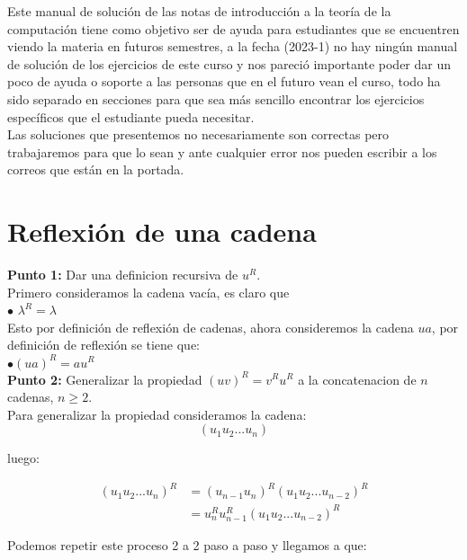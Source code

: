 Este manual de solución de las notas de introducción a la teoría de la computación tiene como objetivo ser de ayuda para estudiantes que se encuentren viendo la materia en futuros semestres, a la fecha (2023-1) no hay ningún manual de solución de los ejercicios de este curso y nos pareció importante poder dar un poco de ayuda o soporte a las personas que en el futuro vean el curso, todo ha sido separado en secciones para que sea más sencillo encontrar los ejercicios específicos que el estudiante pueda necesitar.\\

Las soluciones que presentemos no necesariamente son correctas pero trabajaremos para que lo sean y ante cualquier error nos pueden escribir a los correos que están en la portada.\\

\section{Reflexión de una cadena}

\textbf{Punto 1: }Dar una definicion recursiva de $u^R.$\\

 Primero consideramos la cadena vacía, es claro que \\

\quad $\bullet$ $\lambda^R=\lambda$\\

Esto por definición de reflexión de cadenas, ahora consideremos la cadena $ua$, por definición de reflexión se tiene que:\\

\quad $\bullet (ua)^R=au^R$\\

\textbf{Punto 2: }Generalizar la propiedad $(uv)^R=v^Ru^R$ a la concatenacion de $n$ cadenas, $n\geq2$.\\

 Para generalizar la propiedad consideramos la cadena:\\

$$(u_1u_2...u_n)$$

luego:

\begin{align*}
(u_1u_2...u_n)^R&=(u_{n-1}u_n)^R(u_1u_2...u_{n-2})^R\\
&=u_n^Ru_{n-1}^R(u_1u_2...u_{n-2})^R
\end{align*}


Podemos repetir este proceso 2 a 2 paso a paso y llegamos a que:

